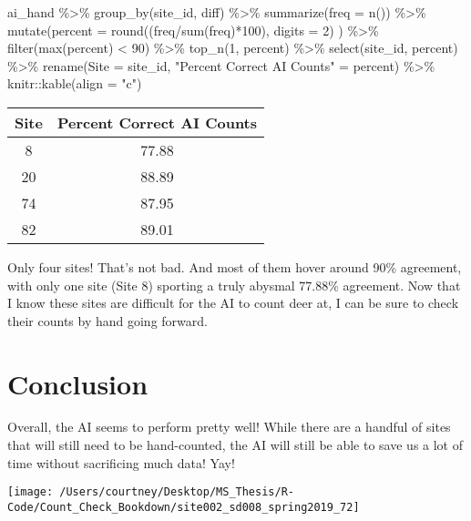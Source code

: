 \documentclass[
]{book}
\newenvironment{Shaded}{\begin{snugshade}}{\end{snugshade}}
\newcommand{\AttributeTok}[1]{\textcolor[rgb]{0.77,0.63,0.00}{#1}}
\newcommand{\DecValTok}[1]{\textcolor[rgb]{0.00,0.00,0.81}{#1}}
\newcommand{\FunctionTok}[1]{\textcolor[rgb]{0.00,0.00,0.00}{#1}}
\newcommand{\NormalTok}[1]{#1}
\newcommand{\OtherTok}[1]{\textcolor[rgb]{0.56,0.35,0.01}{#1}}
\newcommand{\SpecialCharTok}[1]{\textcolor[rgb]{0.00,0.00,0.00}{#1}}
\newcommand{\StringTok}[1]{\textcolor[rgb]{0.31,0.60,0.02}{#1}}
\begin{document}
\begin{Shaded}
\begin{Highlighting}[]
\NormalTok{ai\_hand }\SpecialCharTok{\%\textgreater{}\%} 
  \FunctionTok{group\_by}\NormalTok{(site\_id, diff) }\SpecialCharTok{\%\textgreater{}\%}
  \FunctionTok{summarize}\NormalTok{(}\AttributeTok{freq =} \FunctionTok{n}\NormalTok{()) }\SpecialCharTok{\%\textgreater{}\%}
  \FunctionTok{mutate}\NormalTok{(}\AttributeTok{percent =} \FunctionTok{round}\NormalTok{((freq}\SpecialCharTok{/}\FunctionTok{sum}\NormalTok{(freq)}\SpecialCharTok{*}\DecValTok{100}\NormalTok{), }\AttributeTok{digits =} \DecValTok{2}\NormalTok{) ) }\SpecialCharTok{\%\textgreater{}\%}
  \FunctionTok{filter}\NormalTok{(}\FunctionTok{max}\NormalTok{(percent) }\SpecialCharTok{\textless{}} \DecValTok{90}\NormalTok{) }\SpecialCharTok{\%\textgreater{}\%}
  \FunctionTok{top\_n}\NormalTok{(}\DecValTok{1}\NormalTok{, percent) }\SpecialCharTok{\%\textgreater{}\%}
  \FunctionTok{select}\NormalTok{(site\_id, percent) }\SpecialCharTok{\%\textgreater{}\%}
  \FunctionTok{rename}\NormalTok{(}\AttributeTok{Site =}\NormalTok{ site\_id,}
         \StringTok{"Percent Correct AI Counts"} \OtherTok{=}\NormalTok{ percent) }\SpecialCharTok{\%\textgreater{}\%}
\NormalTok{  knitr}\SpecialCharTok{::}\FunctionTok{kable}\NormalTok{(}\AttributeTok{align =} \StringTok{"c"}\NormalTok{) }
\end{Highlighting}
\end{Shaded}

\begin{tabular}{c|c}
\hline
Site & Percent Correct AI Counts\\
\hline
8 & 77.88\\
\hline
20 & 88.89\\
\hline
74 & 87.95\\
\hline
82 & 89.01\\
\hline
\end{tabular}

Only four sites! That's not bad. And most of them hover around 90\% agreement, with only one site (Site 8) sporting a truly abysmal 77.88\% agreement. Now that I know these sites are difficult for the AI to count deer at, I can be sure to check their counts by hand going forward.

\hypertarget{conclusion}{%
\chapter{Conclusion}\label{conclusion}}

Overall, the AI seems to perform pretty well! While there are a handful of sites that will still need to be hand-counted, the AI will still be able to save us a lot of time without sacrificing much data! Yay!

\begin{center}\texttt{[image: /Users/courtney/Desktop/MS\_Thesis/R-Code/Count\_Check\_Bookdown/site002\_sd008\_spring2019\_72]} \end{center}

  
\end{document}
